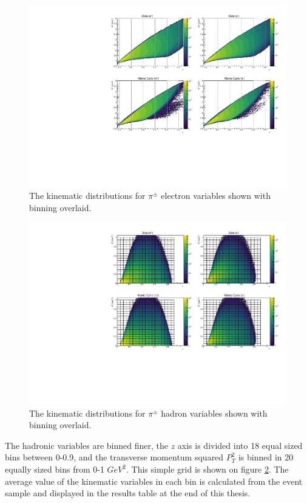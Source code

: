 \begin{figure}
  \centering
  \label{fig:kinematics-xq2}
  \includegraphics[width=\textwidth]{image/plots/sidis/xq2.pdf}
  \caption[Kinematic distributions and binning for electron variables.]{The kinematic distributions for $\pi^{\pm}$ electron variables shown with binning overlaid.}
\end{figure}
\begin{figure}
  \centering
  \label{fig:kinematics-zpt}
  \includegraphics[width=\textwidth]{image/plots/sidis/zpt.pdf}
  \caption[Kinematic distributions and binning for hadron variables.]{The kinematic distributions for $\pi^{\pm}$ hadron variables shown with binning overlaid.}
\end{figure}

The hadronic variables are binned finer, the $z$ axis is divided into 18 equal sized bins between 0-0.9, and the transverse momentum squared $P_T^2$ is binned in 20 equally sized bins from 0-1 $GeV^2$.  This simple grid is shown on figure \ref{fig:kinematics-zpt}.  The average value of the kinematic variables in each bin is calculated from the event sample and displayed in the results table at the end of this thesis.

